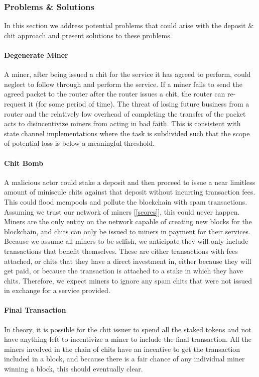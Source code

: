 \documentclass[letterpaper,11pt]{article}
\begin{document}
\subsubsection{Problems \& Solutions}

In this section we address potential problems that could arise with the deposit \& chit approach and present solutions to these problems.

\paragraph{Degenerate Miner} A miner, after being issued a chit for the service it has agreed to perform, could neglect to follow through and perform the service. If a miner fails to send the agreed packet to the router after the router issues a chit, the router can re-request it (for some period of time). The threat of losing future business from a router and the relatively low overhead of completing the transfer of the packet acts to disincentivize miners from acting in bad faith. This is consistent with state channel implementations where the task is subdivided such that the scope of potential loss is below a meaningful threshold.

\paragraph{Chit Bomb} A malicious actor could stake a deposit and then proceed to issue a near limitless amount of miniscule chits against that deposit without incurring transaction fees. This could flood mempools and pollute the blockchain with spam transactions. Assuming we trust our network of miners [\ref{scores}], this could never happen. Miners are the only entity on the network capable of creating new blocks for the blockchain, and chits can only be issued to miners in payment for their services. Because we assume all miners to be selfish, we anticipate they will only include transactions that benefit themselves. These are either transactions with fees attached, or chits that they have a direct investment in, either because they will get paid, or because the transaction is attached to a stake in which they have chits. Therefore, we expect miners to ignore any spam chits that were not issued in exchange for a service provided.

\paragraph{Final Transaction}
In theory, it is possible for the chit issuer to spend all the staked tokens and not have anything left to incentivize a miner to include the final transaction. All the miners involved in the chain of chits have an incentive to get the transaction included in a block, and because there is a fair chance of any individual miner winning a block, this should eventually clear.
\end{document}
